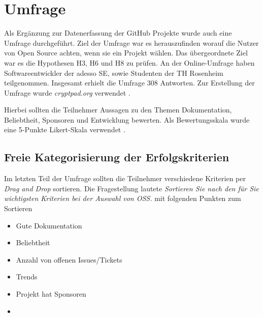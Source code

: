 \chapter{Umfrage}



Als Ergänzung zur Datenerfassung der GitHub Projekte wurde auch eine Umfrage durchgeführt.
Ziel der Umfrage war es herauszufinden worauf die Nutzer von Open Source achten, wenn sie ein Projekt
wählen. Das übergeordnete Ziel war es die Hypothesen H3, H6 und H8 zu prüfen.
An der Online-Umfrage haben Softwareentwickler der adesso SE, sowie Studenten der TH Rosenheim teilgenommen.
Insgesamt erhielt die Umfrage 308 Antworten. Zur Erstellung der Umfrage wurde \textit{cryptpad.org} 
verwendet \cite{Cryptpad_org}.

Hierbei sollten die Teilnehmer Aussagen zu den Themen Dokumentation, Beliebtheit, Sponsoren und
Entwicklung bewerten. Als Bewertungsskala wurde eine 5-Punkte Likert-Skala verwendet \cite{likertScale}.







\newpage




\newpage



\newpage %
\cleardoubleemptypage
\section{Freie Kategorisierung der Erfolgskriterien}\label{sec:umfrage_last_question}


Im letzten Teil der Umfrage sollten die Teilnehmer verschiedene Kriterien per
\textit{Drag and Drop} sortieren. Die Fragestellung lautete
\textit{Sortieren Sie nach den für Sie wichtigsten Kriterien bei der Auswahl von OSS.}
mit folgenden Punkten zum Sortieren


\begin{multicols}{2}
    \begin{itemize}
        \setlength\itemsep{0em}
        \item Gute Dokumentation
        \item Beliebtheit
        \item Anzahl von offenen Issues/Tickets
        \item Trends
        \item Projekt hat Sponsoren
        \item []
    \end{itemize}
\end{multicols}


